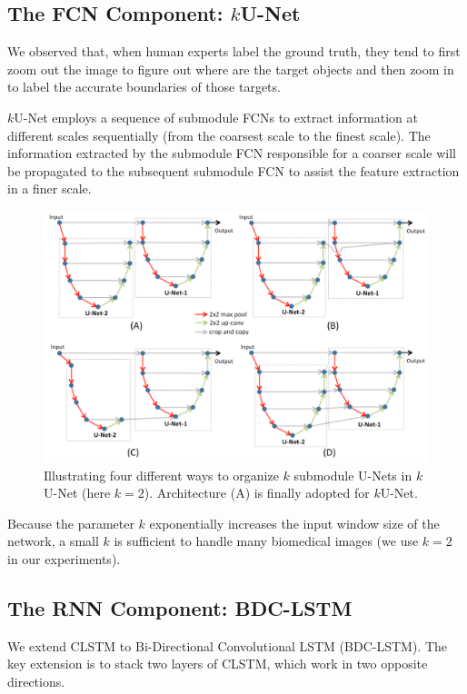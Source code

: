 \documentclass[a4paper,12pt]{article}
\begin{document}
\subsection{The FCN Component: $k$U-Net}

We observed that, when human experts label the ground truth, they tend to first zoom out the image to figure out where are the target objects and then zoom in to label the accurate boundaries of those targets.

$k$U-Net employs a sequence of submodule FCNs to extract information at different scales sequentially (from the coarsest scale to the finest scale). The information extracted by the submodule FCN responsible for a coarser scale will be propagated to the subsequent submodule FCN to assist the feature extraction in a finer scale.

\begin{figure}[ht]
    \includegraphics[width=\columnwidth]{img/ku-net.png}
    \caption{Illustrating four different ways to organize $k$ submodule U-Nets in $k$U-Net (here $k = 2$). Architecture (A) is finally adopted for $k$U-Net.}
\end{figure}

Because the parameter $k$ exponentially increases the input window size of the network, a small $k$ is sufficient to handle many biomedical images (we use $k = 2$ in our experiments).

\subsection{The RNN Component: BDC-LSTM}

We extend CLSTM to Bi-Directional Convolutional LSTM (BDC-LSTM). The key extension is to stack two layers of CLSTM, which work in two opposite directions.
\end{document}
